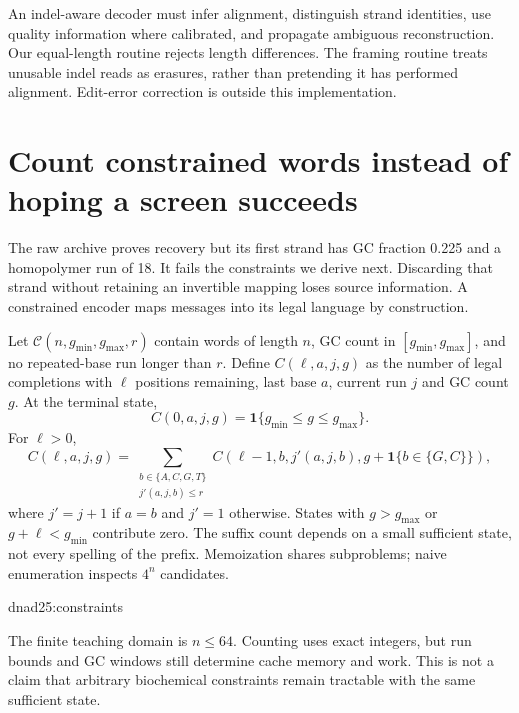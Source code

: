 An indel-aware decoder must infer alignment, distinguish strand identities,
use quality information where calibrated, and propagate ambiguous reconstruction.
Our equal-length routine rejects length differences. The framing
routine treats unusable indel reads as erasures, rather than pretending it has
performed alignment. Edit-error correction is outside this implementation.

\section{Count constrained words instead of hoping a screen succeeds}
The raw archive proves recovery but its first strand has GC fraction 0.225
and a homopolymer run of 18. It fails the constraints we derive next.
Discarding that strand without retaining an invertible mapping loses source
information. A constrained encoder maps messages into its legal language
by construction.

Let $\mathcal C(n,g_{\min},g_{\max},r)$ contain words of length $n$,
GC count in $[g_{\min},g_{\max}]$, and no repeated-base run longer than $r$.
Define $C(\ell,a,j,g)$ as the number of legal completions with $\ell$ positions
remaining, last base $a$, current run $j$ and GC count $g$. At the terminal state,
\[
C(0,a,j,g)=\mathbf 1\{g_{\min}\leq g\leq g_{\max}\}.
\]
For $\ell>0$,
\begin{equation}
C(\ell,a,j,g)=
\sum_{\substack{b\in\{A,C,G,T\}\\j'(a,j,b)\leq r}}
C(\ell-1,b,j'(a,j,b),g+\mathbf 1\{b\in\{G,C\}\}),
\label{dnad25:count}
\end{equation}
where $j'=j+1$ if $a=b$ and $j'=1$ otherwise.
States with $g>g_{\max}$ or $g+\ell<g_{\min}$ contribute zero.
The suffix count depends on a small sufficient state, not every spelling
of the prefix. Memoization shares subproblems; naive enumeration inspects
$4^n$ candidates.

{dnad25:constraints}

The finite teaching domain is $n\leq64$. Counting uses exact integers,
but run bounds and GC windows still determine cache memory and work.
This is not a claim that arbitrary biochemical constraints remain tractable
with the same sufficient state.

